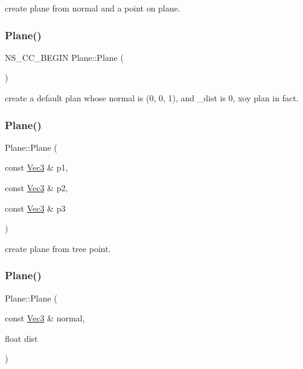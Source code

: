 create plane from normal and a point on plane. \mbox{\label{classPlane_a4601345e067245d9e365f57e1a020ad9}} 
\subsubsection{\texorpdfstring{Plane()}{Plane()}\hspace{0.1cm}{\footnotesize\ttfamily [4/8]}}
{\footnotesize\ttfamily N\+S\+\_\+\+C\+C\+\_\+\+B\+E\+G\+IN Plane\+::\+Plane (\begin{DoxyParamCaption}{ }\end{DoxyParamCaption})}

create a default plan whose normal is (0, 0, 1), and \+\_\+dist is 0, xoy plan in fact. \mbox{\label{classPlane_a85cfdb4f3357ad2ec06e2e1b469d7999}} 
\subsubsection{\texorpdfstring{Plane()}{Plane()}\hspace{0.1cm}{\footnotesize\ttfamily [5/8]}}
{\footnotesize\ttfamily Plane\+::\+Plane (\begin{DoxyParamCaption}\item[{const \hyperlink{classVec3}{Vec3} \&}]{p1,  }\item[{const \hyperlink{classVec3}{Vec3} \&}]{p2,  }\item[{const \hyperlink{classVec3}{Vec3} \&}]{p3 }\end{DoxyParamCaption})}

create plane from tree point. \mbox{\label{classPlane_a609be2a0b19f0d96d1a282357dd0005c}} 
\subsubsection{\texorpdfstring{Plane()}{Plane()}\hspace{0.1cm}{\footnotesize\ttfamily [6/8]}}
{\footnotesize\ttfamily Plane\+::\+Plane (\begin{DoxyParamCaption}\item[{const \hyperlink{classVec3}{Vec3} \&}]{normal,  }\item[{float}]{dist }\end{DoxyParamCaption})}

